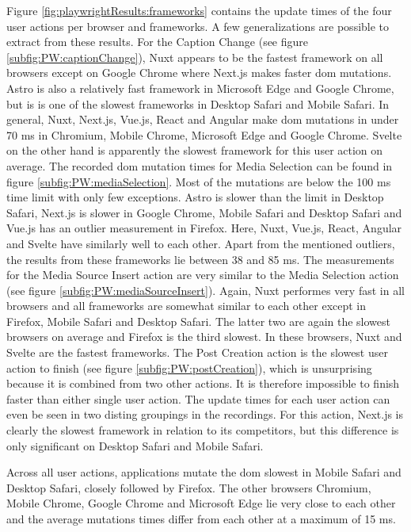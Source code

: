 \documentclass[a4paper, 12pt]{article}
\begin{document}
Figure \ref{fig:playwrightResults:frameworks} contains the update times of the four user actions per browser and frameworks.
A few generalizations are possible to extract from these results.
For the Caption Change (see figure \ref{subfig:PW:captionChange}), Nuxt appears to be the fastest framework on all browsers except on Google Chrome where Next.js makes faster \acrshort{dom} mutations.
Astro is also a relatively fast framework in Microsoft Edge and Google Chrome, but is is one of the slowest frameworks in Desktop Safari and Mobile Safari.
In general, Nuxt, Next.js, Vue.js, React and Angular make \acrshort{dom} mutations in under 70 ms in Chromium, Mobile Chrome, Microsoft Edge and Google Chrome.
Svelte on the other hand is apparently the slowest framework for this user action on average.
The recorded \acrshort{dom} mutation times for Media Selection can be found in figure \ref{subfig:PW:mediaSelection}.
Most of the mutations are below the 100 ms time limit with only few exceptions.
Astro is slower than the limit in Desktop Safari, Next.js is slower in Google Chrome, Mobile Safari and Desktop Safari and Vue.js has an outlier measurement in Firefox.
Here, Nuxt, Vue.js, React, Angular and Svelte have similarly well to each other.
Apart from the mentioned outliers, the results from these frameworks lie between 38 and 85 ms.
The measurements for the Media Source Insert action are very similar to the Media Selection action (see figure \ref{subfig:PW:mediaSourceInsert}).
Again, Nuxt performes very fast in all browsers and all frameworks are somewhat similar to each other except in Firefox, Mobile Safari and Desktop Safari.
The latter two are again the slowest browsers on average and Firefox is the third slowest.
In these browsers, Nuxt and Svelte are the fastest frameworks.
The Post Creation action is the slowest user action to finish (see figure \ref{subfig:PW:postCreation}), which is unsurprising because it is combined from two other actions.
It is therefore impossible to finish faster than either single user action.
The update times for each user action can even be seen in two disting groupings in the recordings.
For this action, Next.js is clearly the slowest framework in relation to its competitors, but this difference is only significant on Desktop Safari and Mobile Safari.

Across all user actions, applications mutate the \acrshort{dom} slowest in Mobile Safari and Desktop Safari, closely followed by Firefox.
The other browsers Chromium, Mobile Chrome, Google Chrome and Microsoft Edge lie very close to each other and the average mutations times differ from each other at a maximum of 15 ms.
\end{document}
